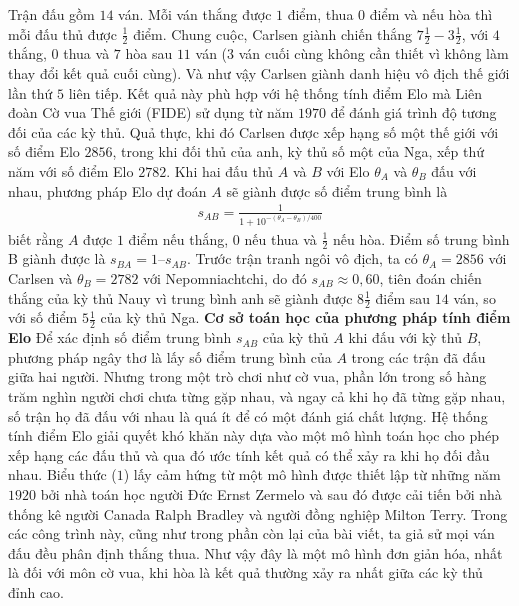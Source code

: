 \begin{multicols}{2}
	\vskip 0.05cm
	Trận đấu gồm $14$ ván. Mỗi ván thắng được $1$ điểm, thua $0$ điểm và nếu hòa thì mỗi đấu thủ được $\frac{1}{2}$ điểm. Chung cuộc, Carlsen giành chiến thắng $7\frac{1}{2} - 3\frac{1}{2}$, với $4$ thắng, $0$ thua và $7$ hòa sau $11$ ván ($3$ ván cuối cùng không cần thiết vì không làm thay đổi kết quả cuối cùng). Và như vậy Carlsen giành danh hiệu vô địch thế giới lần thứ $5$ liên tiếp.
	\vskip 0.05cm
	Kết quả này phù hợp với hệ thống tính điểm Elo mà Liên đoàn Cờ vua Thế giới (FIDE) sử dụng từ năm $1970$ để đánh giá trình độ tương đối của các kỳ thủ. Quả thực, khi đó Carlsen được xếp hạng số một thế giới với số điểm Elo $2856$, trong khi đối thủ của anh, kỳ thủ số một của Nga, xếp thứ năm với số điểm Elo $2782$.
	\vskip 0.05cm
	Khi hai đấu thủ $A$ và $B$ với Elo $\theta_A$ và $\theta_B$ đấu với nhau, phương pháp Elo dự đoán $A$ sẽ giành được số điểm trung bình là
	\setlength{\abovedisplayskip}{4pt}
	\setlength{\belowdisplayskip}{4pt}
	\begin{align*}
		s_{AB} = \frac{1}{1+ 10^{-(\theta_A - \theta_B) /400}} \tag{$1$}
	\end{align*}
	biết rằng $A$ được $1$ điểm nếu thắng, $0$ nếu thua và $\frac{1}{2}$ nếu hòa. Điểm số trung bình B giành được là $s_{BA} = 1 – s_{AB}$.
	\vskip 0.05cm
	Trước trận tranh ngôi vô địch, ta có $\theta_A = 2856$ với Carlsen và $\theta_B = 2782$ với Nepomniachtchi, do đó $s_{AB} \approx 0{,}60$, tiên đoán chiến thắng của kỳ thủ Nauy vì trung bình anh sẽ giành được $8\frac{1}{2}$ điểm sau $14$ ván, so với số điểm $5\frac{1}{2}$ của kỳ thủ Nga.
	\vskip 0.05cm
	\textbf{\color{toanhocdoisong}Cơ sở toán học của phương pháp tính điểm Elo}
	\vskip 0.05cm
	Để xác định số điểm trung bình $s_{AB}$ của kỳ thủ $A$ khi đấu với kỳ thủ $B$, phương pháp ngây thơ là lấy số điểm trung bình của $A$ trong các trận đã đấu giữa hai người. Nhưng trong một trò chơi như cờ vua, phần lớn trong số hàng trăm nghìn người chơi chưa từng gặp nhau, và ngay cả khi họ đã từng gặp nhau, số trận họ đã đấu với nhau là quá ít để có một đánh giá chất lượng. Hệ thống tính điểm Elo giải quyết khó khăn này dựa vào một mô hình toán học cho phép xếp hạng các đấu thủ và qua đó ước tính kết quả có thể xảy ra khi họ đối đầu nhau.
	\vskip 0.02cm
	Biểu thức ($1$) lấy cảm hứng từ một mô hình được thiết lập từ những năm $1920$ bởi nhà toán học người Đức Ernst Zermelo và sau đó được cải tiến bởi nhà thống kê người Canada Ralph Bradley và người đồng nghiệp Milton Terry. Trong các công trình này, cũng như trong phần còn lại của bài viết, ta giả sử mọi ván đấu đều phân định thắng thua. Như vậy đây là một mô hình đơn giản hóa, nhất là đối với môn cờ vua, khi hòa là kết quả thường xảy ra nhất giữa các kỳ thủ đỉnh cao.

\end{multicols}
